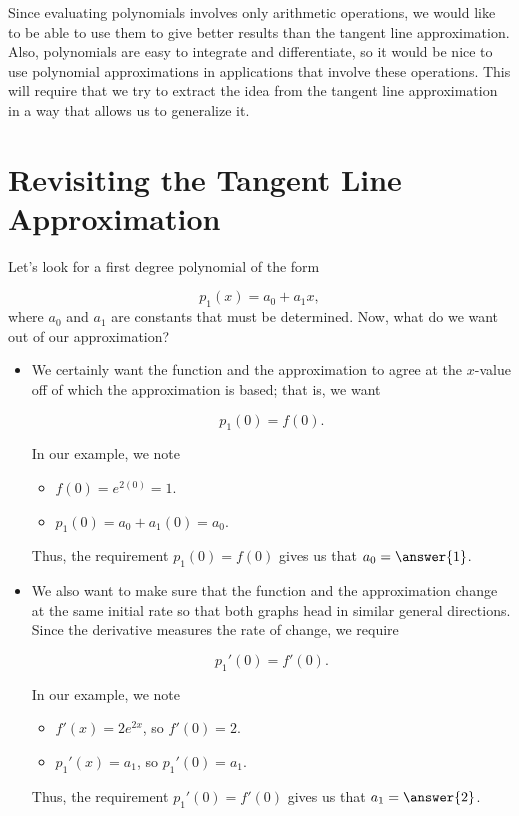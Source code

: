 \documentclass{ximera}
\begin{document}
Since evaluating polynomials involves only arithmetic operations, we would like to be able to use them to give better results than the tangent line approximation. Also, polynomials are easy to integrate and differentiate, so it would be nice to use polynomial approximations in applications that involve these operations.  This will require that we try to extract the idea from the tangent line approximation in a way that allows us to generalize it.

\section{Revisiting the Tangent Line Approximation}
Let's look for a first degree polynomial of the form 

\[
p_1(x) = a_0+a_1x,
\]
where $a_0$ and $a_1$ are constants that must be determined.  Now, what do we want out of our approximation?

\begin{itemize}
\item We certainly want the function and the approximation to agree at the $x$-value off of which the approximation is based; that is, we want

\[
p_1(0) =f(0).
\]

In our example, we note

\begin{itemize}
\item $f(0) = e^{2(0)} =1$.
\item $p_1(0) = a_0+a_1(0) = a_0$.
\end{itemize}
Thus, the requirement $p_1(0) =f(0)$ gives us that $a_0=\answer{1}$.
 
\item We also want to make sure that the function and the approximation change at the same initial rate so that both graphs head in similar general directions.  Since the derivative measures the rate of change, we require

\[
p_1'(0) =f'(0).
\] 

In our example, we note

\begin{itemize}
\item $f'(x) = 2e^{2x}$, so $f'(0) = 2$.
\item $p_1'(x) = a_1$, so $p_1'(0) = a_1$.
\end{itemize}
Thus, the requirement $p_1'(0) =f'(0)$ gives us that $a_1=\answer{2}$.

\end{itemize}
\end{document}

